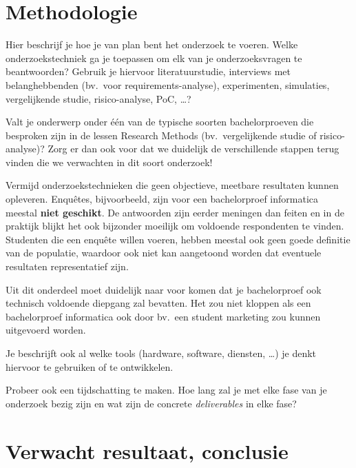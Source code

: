 
\section{Methodologie}%
\label{sec:methodologie}

Hier beschrijf je hoe je van plan bent het onderzoek te voeren. Welke onderzoekstechniek ga je toepassen om elk van je onderzoeksvragen te beantwoorden? Gebruik je hiervoor literatuurstudie, interviews met belanghebbenden (bv.~voor requirements-analyse), experimenten, simulaties, vergelijkende studie, risico-analyse, PoC, \ldots?

Valt je onderwerp onder één van de typische soorten bachelorproeven die besproken zijn in de lessen Research Methods (bv.\ vergelijkende studie of risico-analyse)? Zorg er dan ook voor dat we duidelijk de verschillende stappen terug vinden die we verwachten in dit soort onderzoek!

Vermijd onderzoekstechnieken die geen objectieve, meetbare resultaten kunnen opleveren. Enquêtes, bijvoorbeeld, zijn voor een bachelorproef informatica meestal \textbf{niet geschikt}. De antwoorden zijn eerder meningen dan feiten en in de praktijk blijkt het ook bijzonder moeilijk om voldoende respondenten te vinden. Studenten die een enquête willen voeren, hebben meestal ook geen goede definitie van de populatie, waardoor ook niet kan aangetoond worden dat eventuele resultaten representatief zijn.

Uit dit onderdeel moet duidelijk naar voor komen dat je bachelorproef ook technisch voldoen\-de diepgang zal bevatten. Het zou niet kloppen als een bachelorproef informatica ook door bv.\ een student marketing zou kunnen uitgevoerd worden.

Je beschrijft ook al welke tools (hardware, software, diensten, \ldots) je denkt hiervoor te gebruiken of te ontwikkelen.

Probeer ook een tijdschatting te maken. Hoe lang zal je met elke fase van je onderzoek bezig zijn en wat zijn de concrete \emph{deliverables} in elke fase?

\section{Verwacht resultaat, conclusie}%
\label{sec:verwachte_resultaten}

